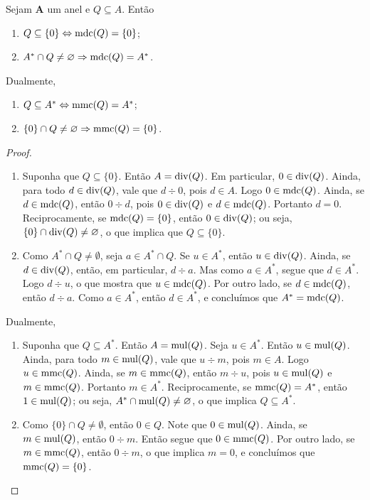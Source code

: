\begin{prop}
Sejam $\bm A$ um anel e $Q \subseteq A$. Então
	\begin{enumerate}
	\item $Q \subseteq \{0\} \Leftrightarrow \operatorname{mdc}(Q) = \{0\}$;
	\item $A^* \cap Q \neq \varnothing \Rightarrow \operatorname{mdc}(Q) = A^*$.
	\end{enumerate}

	Dualmente,
	\begin{enumerate}
	\item $Q \subseteq A^* \Leftrightarrow \operatorname{mmc}(Q) = A^*$;
	\item $\{0\} \cap Q \neq \varnothing \Rightarrow \operatorname{mmc}(Q) = \{0\}$.
	\end{enumerate}
\end{prop}
\begin{proof}
	\begin{enumerate}
	\item Suponha que $Q \subseteq \{0\}$. Então $A = \operatorname{div}(Q)$. Em particular, $0 \in \operatorname{div}(Q)$. Ainda, para todo $d \in \operatorname{div}(Q)$, vale que $d \div 0$, pois $d \in A$. Logo $0 \in \operatorname{mdc}(Q)$. Ainda, se $d \in \operatorname{mdc}(Q)$, então $0 \div d$, pois $0 \in \operatorname{div}(Q)$ e $d \in \operatorname{mdc}(Q)$. Portanto $d=0$. Reciprocamente, se $\operatorname{mdc}(Q)=\{0\}$, então $0 \in \operatorname{div}(Q)$; ou seja, $\{0\} \cap \operatorname{div}(Q) \neq \varnothing$, o que implica que $Q \subseteq \{0\}$.

	\item Como $A^* \cap Q \neq \emptyset$, seja $a \in A^* \cap Q$. Se $u \in A^*$, então $u \in \operatorname{div}(Q)$. Ainda, se $d \in \operatorname{div}(Q)$, então, em particular, $d \div a$. Mas como $a \in A^*$, segue que $d \in A^*$. Logo $d \div u$, o que mostra que $u \in \operatorname{mdc}(Q)$. Por outro lado, se $d \in \operatorname{mdc}(Q)$, então $d \div a$. Como $a \in A^*$, então $d \in A^*$, e concluímos que $A^*=\operatorname{mdc}(Q)$.
	\end{enumerate}

Dualmente,
	\begin{enumerate}
	\item Suponha que $Q \subseteq A^*$. Então $A = \operatorname{mul}(Q)$. Seja $u \in A^*$. Então $u \in \operatorname{mul}(Q)$. Ainda, para todo $m \in \operatorname{mul}(Q)$, vale que $u \div m$, pois $m \in A$. Logo $u \in \operatorname{mmc}(Q)$. Ainda, se $m \in \operatorname{mmc}(Q)$, então $m \div u$, pois $u \in \operatorname{mul}(Q)$ e $m \in \operatorname{mmc}(Q)$. Portanto $m \in A^*$. Reciprocamente, se $\operatorname{mmc}(Q)=A^*$, então $1 \in \operatorname{mul}(Q)$; ou seja, $A^* \cap \operatorname{mul}(Q) \neq \varnothing$, o que implica $Q \subseteq A^*$.

	\item Como $\{0\} \cap Q \neq \emptyset$, então $0 \in Q$. Note que $0 \in \operatorname{mul}(Q)$. Ainda, se $m \in \operatorname{mul}(Q)$, então $0 \div m$. Então segue que $0 \in \operatorname{mmc}(Q)$. Por outro lado, se $m \in \operatorname{mmc}(Q)$, então $0 \div m$, o que implica $m=0$, e concluímos que $\operatorname{mmc}(Q) = \{0\}$.
	\qedhere
	\end{enumerate}
\end{proof}

